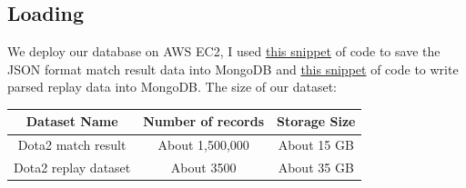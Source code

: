 \documentclass{article}
\begin{document}
\subsection{Loading}
We deploy our database on AWS EC2, I used \href{https://github.com/Vopaaz/big-data-psg-lgd/blob/a9a285e0e29c0d9e56b41994875df830c7e7b51b/src/main/java/FetchStore/ValveAPI.java#L164-L178}{this snippet} of code to save the JSON format match result data into MongoDB and \href{https://github.com/Vopaaz/big-data-psg-lgd/blob/a9a285e0e29c0d9e56b41994875df830c7e7b51b/src/main/java/FetchStore/ValveAPI.java#L406-L420}{this snippet} of code to write parsed replay data into MongoDB.
The size of our dataset: \\

\begin{tabular}{|c|c|c|}
\hline
Dataset Name & Number of records & Storage Size \\
\hline
Dota2 match result & About 1,500,000 & About 15 GB \\
\hline
Dota2 replay dataset & About 3500 & About 35 GB \\
\hline
\end{tabular}
\end{document}
